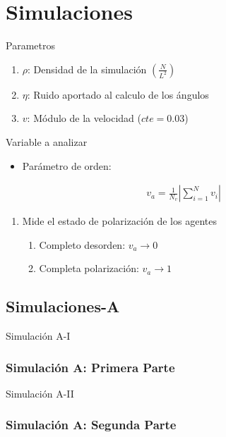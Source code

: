 \documentclass{beamer}
\begin{document}
\section{Simulaciones}

\begin{frame}{Parametros}
    \begin{enumerate}
        \item[1] $\rho$: Densidad de la simulación $(\frac{N}{L^2})$
        \item[2] $\eta$: Ruido aportado al calculo de los ángulos
        \item[3] $v$: Módulo de la velocidad ($cte=0.03$)
    \end{enumerate}
\end{frame}

\begin{frame}{Variable a analizar}
    \begin{itemize}
        \item[$\ast$] Parámetro de orden:
    \end{itemize}
    \begin{center}
        \begin{align}
            v_a=\frac{1}{N_v}|\sum\limits^{N}_{i=1} v_i|
        \end{align}
        \begin{enumerate}
            \item[$\ast$] Mide el estado de polarización de los agentes
                \begin{enumerate}
                    \item[i] Completo desorden: $v_a\rightarrow 0$
                    \item[ii] Completa polarización: $v_a\rightarrow 1$
                \end{enumerate}
        \end{enumerate}
    \end{center}
\end{frame}

\subsection{Simulaciones-A}
\begin{frame}{Simulación A-I}

\frametitle{Simulación A: Primera Parte}
\end{frame}

\begin{frame}{Simulación A-II}

\frametitle{Simulación A: Segunda Parte}
\end{frame}
\end{document}
